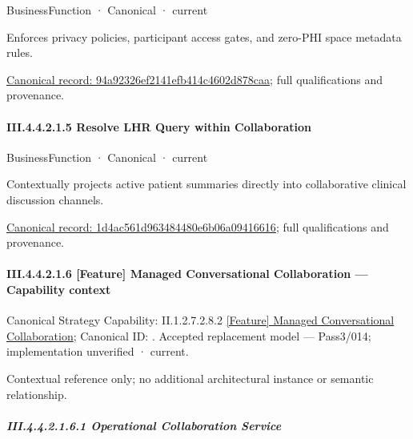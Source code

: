 \label{element:94a92326ef2141efb414c4602d878caa}
{\small BusinessFunction · Canonical · current}\par

Enforces privacy policies, participant access gates, and zero-PHI space metadata rules.


{\footnotesize \href{../../../../../../../../continuum/business/business-function/94a92326ef2141efb414c4602d878caa.md}{Canonical record: 94a92326ef2141efb414c4602d878caa}; full qualifications and provenance.}\par
\paragraph*{III.4.4.2.1.5 Resolve LHR Query within Collaboration}
\label{navigation:III.4.4.2.1.5}

\label{element:1d4ac561d963484480e6b06a09416616}
{\small BusinessFunction · Canonical · current}\par

Contextually projects active patient summaries directly into collaborative clinical discussion channels.


{\footnotesize \href{../../../../../../../../continuum/business/business-function/1d4ac561d963484480e6b06a09416616.md}{Canonical record: 1d4ac561d963484480e6b06a09416616}; full qualifications and provenance.}\par
\paragraph*{III.4.4.2.1.6 [Feature] Managed Conversational Collaboration — Capability context}
\label{navigation:III.4.4.2.1.6}

{\small Canonical Strategy Capability: II.1.2.7.2.8.2 \hyperref[element:7d5b0b4be98d40afac257d04035d20a4]{[Feature] Managed Conversational Collaboration}; Canonical ID: \texttt{}. Accepted replacement model — Pass3/014; implementation unverified · current.}\par
Contextual reference only; no additional architectural instance or semantic relationship.\par
\subparagraph*{III.4.4.2.1.6.1 Operational Collaboration Service}
\label{navigation:III.4.4.2.1.6.1}

